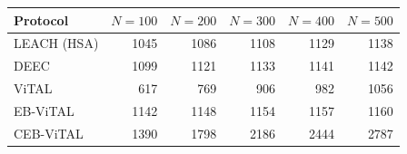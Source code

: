 \begin{tabular}{lrrrrr}
\hline
Protocol & $N=100$ & $N=200$ & $N=300$ & $N=400$ & $N=500$ \\
\hline
LEACH (HSA) & 1045 & 1086 & 1108 & 1129 & 1138 \\
DEEC & 1099 & 1121 & 1133 & 1141 & 1142 \\
ViTAL & 617 & 769 & 906 & 982 & 1056 \\
EB-ViTAL & 1142 & 1148 & 1154 & 1157 & 1160 \\
CEB-ViTAL & 1390 & 1798 & 2186 & 2444 & 2787 \\
\hline
\end{tabular}
